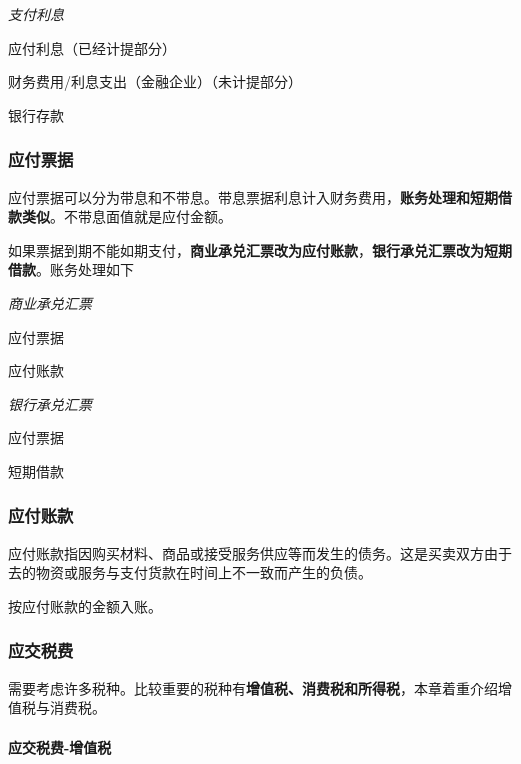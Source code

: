 \documentclass[UTF8,12pt]{ctexart}
\newenvironment{Dr}{%
	\begin{list}{}%
		{
			\setlength{\leftmargin}{2em}
			\setlength{\labelwidth}{2em}
			\setlength{\labelsep}{0pt}
			\setlength{\itemindent}{0pt}
			\setlength{\listparindent}{0pt}
			\setlength{\parsep}{0pt}
			\setlength{\topsep}{0pt}
		}
		\item[\textbf{借：}]
	}{%
	\end{list}
}
\newenvironment{Cr}{%
	\begin{list}{}%
		{
			\setlength{\leftmargin}{2em}
			\setlength{\labelwidth}{2em}
			\setlength{\labelsep}{0pt}
			\setlength{\itemindent}{0pt}
			\setlength{\listparindent}{0pt}
			\setlength{\parsep}{0pt}
			\setlength{\topsep}{0pt}
		}
		\item[\textbf{贷：}]
	}{%
	\end{list}
}
\numberwithin{equation}{section} %
\numberwithin{figure}{section}
\numberwithin{table}{section}
\begin{document}
	
	\textit{支付利息}
	
	\begin{Dr}
		应付利息（已经计提部分）
		
		财务费用/利息支出（金融企业）（未计提部分）
	\end{Dr}
	\begin{Cr}
		银行存款
	\end{Cr}
	

	
	\subsubsection{应付票据}
	应付票据可以分为带息和不带息。带息票据利息计入财务费用，\textbf{账务处理和短期借款类似}。不带息面值就是应付金额。
	
	如果票据到期不能如期支付，\textbf{商业承兑汇票改为应付账款}，\textbf{银行承兑汇票改为短期借款}。账务处理如下
	
	\textit{商业承兑汇票}
	
	\begin{Dr}
		应付票据
	\end{Dr}
	\begin{Cr}
		应付账款
	\end{Cr}

	
	\textit{银行承兑汇票}
	
	\begin{Dr}
		应付票据
	\end{Dr}
	\begin{Cr}
		短期借款
	\end{Cr}

	
	\subsubsection{应付账款}
	
	应付账款指因购买材料、商品或接受服务供应等而发生的债务。这是买卖双方由于去的物资或服务与支付货款在时间上不一致而产生的负债。
	
	按应付账款的金额入账。
	
	\subsubsection{应交税费}
	
	需要考虑许多税种。比较重要的税种有\textbf{增值税、消费税和所得税}，本章着重介绍增值税与消费税。
	
	\paragraph{应交税费-增值税}
	
\end{document}
